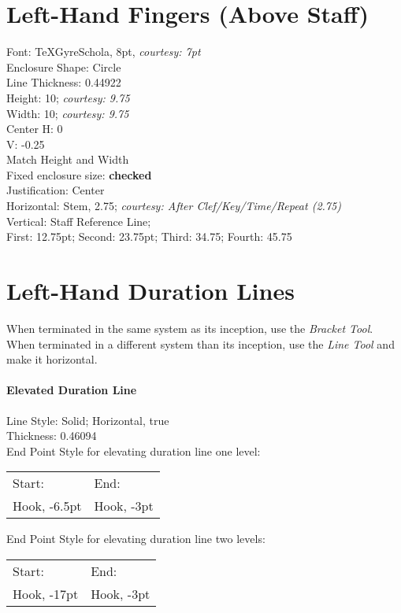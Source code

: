 \documentclass[]{memoir}
\begin{document}
\section{Left-Hand Fingers (Above Staff)}
\label{sec:left-hand-fingers}

Font: TeXGyreSchola, 8pt, \emph{courtesy: 7pt}\\
Enclosure Shape: Circle\\
Line Thickness: 0.44922\\
Height: 10; \emph{courtesy: 9.75}\\
Width: 10; \emph{courtesy: 9.75}\\
Center H: 0\\
V: -0.25\\
Match Height and Width\\
Fixed enclosure size: \textbf{checked}\\
Justification: Center\\
Horizontal: Stem, 2.75; \emph{courtesy: After Clef/Key/Time/Repeat (2.75)}\\
Vertical: Staff Reference Line;\\
First: 12.75pt; Second: 23.75pt; Third: 34.75; Fourth: 45.75

\section{Left-Hand Duration Lines}
\label{sec:left-hand-duration}

When terminated in the same system as its inception, use the \emph{Bracket Tool}.\\
When terminated in a different system than its inception, use the \emph{Line Tool} and make it horizontal.

\paragraph{Elevated Duration Line}
\label{sec:elev-durat-line}

Line Style: Solid; Horizontal, true\\
Thickness: 0.46094\\
End Point Style for elevating duration line one level:\\
\begin{tabular}{l l}
  Start: & End:\\
  Hook, -6.5pt & Hook, -3pt\\
\end{tabular}

\noindent End Point Style for elevating duration line two levels:\\
\begin{tabular}{l l}
  Start: & End:\\
  Hook, -17pt & Hook, -3pt\\
\end{tabular}
\end{document}
